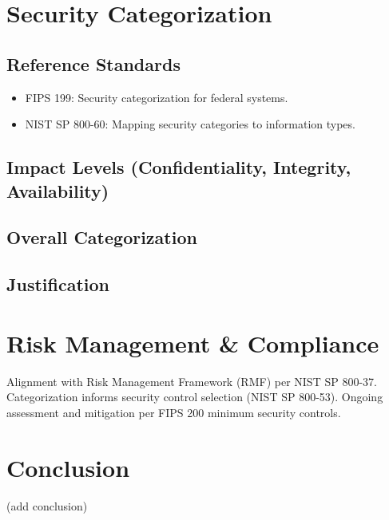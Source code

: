\documentclass{article}
\begin{document}
\section{Security Categorization}

\subsection{Reference Standards}
\begin{itemize}
    \item FIPS 199: Security categorization for federal systems.
    \item NIST SP 800-60: Mapping security categories to information types.
\end{itemize}

\subsection{Impact Levels (Confidentiality, Integrity, Availability)}


\subsection{Overall Categorization}

\subsection{Justification}

\newpage

\section{Risk Management \& Compliance}
\par Alignment with Risk Management Framework (RMF) per NIST SP 800-37. 
Categorization informs security control selection (NIST SP 800-53). 
Ongoing assessment and mitigation per FIPS 200 minimum security controls.

\section{Conclusion}
\par (add conclusion)
\end{document}
